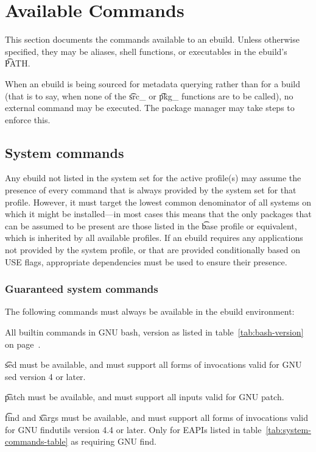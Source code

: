 \section{Available Commands}

This section documents the commands available to an ebuild. Unless otherwise specified, they may be
aliases, shell functions, or executables in the ebuild's \t{PATH}.

When an ebuild is being sourced for metadata querying rather than for a build (that is to say,
when none of the \t{src\_} or \t{pkg\_} functions are to be called), no external command may
be executed. The package manager may take steps to enforce this.

\subsection{System commands}

Any ebuild not listed in the system set for the active profile(s) may assume the presence of every
command that is always provided by the system set for that profile. However, it must target the
lowest common denominator of all systems on which it might be installed---in most cases this means
that the only packages that can be assumed to be present are those listed in the \t{base} profile or
equivalent, which is inherited by all available profiles. If an ebuild requires any applications not
provided by the system profile, or that are provided conditionally based on USE flags, appropriate
dependencies must be used to ensure their presence.

\subsubsection{Guaranteed system commands}
\label{sec:guaranteed-system-commands}

The following commands must always be available in the ebuild environment:
\begin{compactitem}
\item All builtin commands in GNU bash, version as listed in table~\ref{tab:bash-version} on
    page~\pageref{tab:bash-version}.
\item \t{sed} must be available, and must support all forms of invocations valid for GNU sed
    version 4 or later.
\item \t{patch} must be available, and must support all inputs valid for GNU patch.
\item {} \t{find} and \t{xargs} must be available, and must support all forms
    of invocations valid for GNU findutils version 4.4 or later. Only for EAPIs listed in
    table~\ref{tab:system-commands-table} as requiring GNU find.
\end{compactitem}

